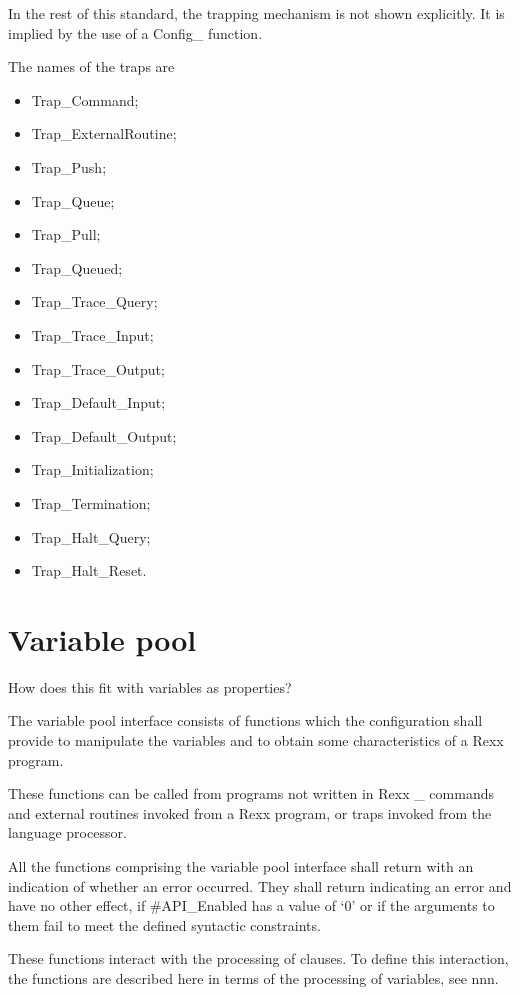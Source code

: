 In the rest of this standard, the trapping mechanism is not shown
explicitly. It is implied by the use of a Config\_ function.

The names of the traps are

\begin{itemize}
\tightlist
\item
  Trap\_Command;
\item
  Trap\_ExternalRoutine;
\item
  Trap\_Push;
\item
  Trap\_Queue;
\item
  Trap\_Pull;
\item
  Trap\_Queued;
\item
  Trap\_Trace\_Query;
\item
  Trap\_Trace\_Input;
\item
  Trap\_Trace\_Output;
\item
  Trap\_Default\_Input;
\item
  Trap\_Default\_Output;
\item
  Trap\_Initialization;
\item
  Trap\_Termination;
\item
  Trap\_Halt\_Query;
\item
  Trap\_Halt\_Reset.
\end{itemize}

\section{Variable pool}\label{variable-pool}

How does this fit with variables as properties?

The variable pool interface consists of functions which the
configuration shall provide to manipulate the variables and to obtain
some characteristics of a Rexx program.

These functions can be called from programs not written in Rexx \_
commands and external routines invoked from a Rexx program, or traps
invoked from the language processor.

All the functions comprising the variable pool interface shall return
with an indication of whether an error occurred. They shall return
indicating an error and have no other effect, if \#API\_Enabled has a
value of `0' or if the arguments to them fail to meet the defined
syntactic constraints.

These functions interact with the processing of clauses. To define this
interaction, the functions are described here in terms of the processing
of variables, see nnn.

